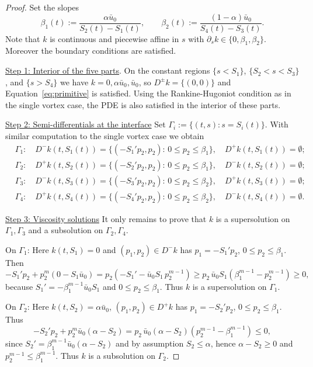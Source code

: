 \documentclass[11pt]{article}
\numberwithin{equation}{section} %
\begin{document}
\begin{proof}
Set the slopes
$$
\beta_1(t):=\frac{\alpha \bar u_0}{S_2(t)-S_1(t)},\qquad
\beta_2(t):=\frac{(1-\alpha)\bar u_0}{S_4(t)-S_3(t)}.
$$
Note that $k$ is continuous and piecewise affine in $s$ with $\partial_sk\in\{0,\beta_1,\beta_2\}$. Moreover the boundary conditions are satisfied.

\underline{Step 1: Interior of the five parts}. On the constant regions $\{s<S_1\}$, $\{S_2<s<S_3\}$, and $\{s>S_4\}$ we have $k= 0,\alpha\bar u_0,\bar u_0$, so $D^\pm k=\{(0,0)\}$ and Equation~\eqref{eq:primitive} is satisfied. Using the Rankine-Hugoniot condition as in the single vortex case, the PDE is also satisfied in the interior of these parts.

\underline{Step 2: Semi-differentials at the interface}
Set $\Gamma_i:=\{(t,s): s=S_i(t)\}$. With similar computation to the single vortex case we obtain
\begin{align*}
&\Gamma_1:\quad D^{-}k(t,S_{1}(t))=\{(-S_1'p_2,p_2):\,0\le p_2\le \beta_1\},\quad D^{+}k(t,S_{1}(t))=\emptyset;\\
&\Gamma_2:\quad D^{+}k(t,S_{2}(t))=\{(-S_2'p_2,p_2):\,0\le p_2\le \beta_1\},\quad D^{-}k(t,S_{2}(t))=\emptyset;\\
&\Gamma_3:\quad D^{-}k(t,S_{3}(t))=\{(-S_3'p_2,p_2):\,0\le p_2\le \beta_2\},\quad D^{+}k(t,S_{3}(t))=\emptyset;\\
&\Gamma_4:\quad D^{+}k(t,S_{4}(t))=\{(-S_4'p_2,p_2):\,0\le p_2\le \beta_2\},\quad D^{-}k(t,S_{4 }(t))=\emptyset.
\end{align*}

\underline{Step 3: Viscosity solutions}
It only remains to prove that $k$ is a supersolution on $\Gamma_1, \Gamma_3$ and a subsolution on $\Gamma_2, \Gamma_4$. 

On $\Gamma_1$:
Here $k(t,S_1)=0$ and $(p_1,p_2)\in D^-k$ has $p_1=-S_1' p_2$, $0\le p_2\le\beta_1$. Then
$$
-S_1'p_2+p_2^{m}(0-S_1\bar u_0)
=p_2(-S_1'-\bar u_0 S_1\,p_2^{m-1})
\ge p_2\,\bar u_0 S_1(\beta_1^{m-1}-p_2^{m-1})\ge0,
$$
because $S_1'=-\beta_1^{m-1}\bar u_0 S_1$ and $0\le p_2\le\beta_1$. Thus $k$ is a supersolution on $\Gamma_1$. 

On $\Gamma_2$:
Here $k(t,S_2)=\alpha\bar u_0$, $(p_1,p_2)\in D^+k$ has $p_1=-S_2'p_2$, $0\le p_2\le\beta_1$. Thus
 $$
-S_2'p_2+p_2^{m}\bar u_0(\alpha-S_2)
=p_2\,\bar u_0(\alpha-S_2) (p_2^{m-1}-\beta_1^{m-1} )\le0,
 $$
since $S_2'=\beta_1^{m-1}\bar u_0(\alpha-S_2)$ and by assumption $S_2\le\alpha$, hence $\alpha-S_2\ge0$ and $p_2^{m-1}\le\beta_1^{m-1}$. Thus $k$ is a subsolution on $\Gamma_2$. 


\end{proof}
\end{document}
